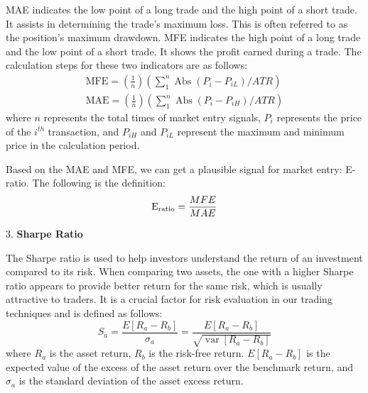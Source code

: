 \documentclass{mcmthesis}
\begin{document}
MAE indicates the low point of a long trade and the high point of a short trade. It assists in determining the trade's maximum loss. This is often referred to as the position's maximum drawdown. MFE indicates the high point of a long trade and the low point of a short trade. It shows the profit earned during a trade. The calculation steps for these two indicators are as follows:
\begin{gather}
	\mathrm{MFE}=\left(\frac{1}{n}\right)\left(\sum_{1}^{n} \operatorname{Abs}(P_{i}-P_{iL}) / ATR\right) \\
\mathrm{MAE}=\left(\frac{1}{n}\right)\left(\sum_{1}^{n} \operatorname{Abs}(P_{i}-P_{iH}) / ATR\right) 
\end{gather}
where $n$ represents the total times of market entry signals, $P_{i}$ represents the price of the $i^{th}$ transaction, and $P_{iH}$ and $P_{iL}$ represent the maximum and minimum price in the calculation period.

Based on the MAE and MFE, we can get a plausible signal for market entry: E-ratio. The following is the definition:
\begin{equation}
	\mathrm{E_{ratio}}=\frac{MFE}{MAE}\\
\end{equation}

3. \textbf{Sharpe Ratio}

The Sharpe ratio is used to help investors understand the return of an investment compared to its risk. When comparing two assets, the one with a higher Sharpe ratio appears to provide better return for the same risk, which is usually attractive to traders\cite{sharpe}. It is a crucial factor for risk evaluation in our trading techniques and is defined as follows:
\begin{equation}
	S_{a}=\frac{E\left[R_{a}-R_{b}\right]}{\sigma_{a}}=\frac{E\left[R_{a}-R_{b}\right]}{\sqrt{\operatorname{var}\left[R_{a}-R_{b}\right]}}
\end{equation}
where $R_{a}$ is the asset return, $R_{b}$ is the risk-free return. $E[R_{a}-R_{b}]$ is the expected value of the excess of the asset return over the benchmark return, and $\sigma _{a}$ is the standard deviation of the asset excess return.
\end{document}
